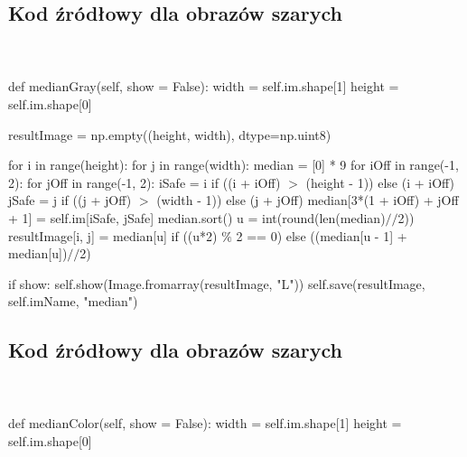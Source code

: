 \documentclass[final,a4paper,openany,12pt]{mwbk}
\begin{document}
\newpage

\subsection*{Kod źródłowy dla obrazów szarych}
\hfill
\\\\
\noindent def medianGray(self, show = False): \newline
\indent width = self.im.shape[1] \newline
\indent height = self.im.shape[0] \newline

resultImage = np.empty((height, width), dtype=np.uint8) \newline

for i in range(height): \newline
\indent for j in range(width): \newline
\indent median = [0] * 9 \newline
\indent for iOff in range(-1, 2): \newline
\indent for jOff in range(-1, 2): \newline
\indent iSafe = i if ((i + iOff) $>$ (height - 1)) else (i + iOff) \newline
\indent jSafe = j if ((j + jOff) $>$ (width - 1)) else (j + jOff) \newline
\indent median[3*(1 + iOff) + jOff + 1] = self.im[iSafe, jSafe] \newline
\indent median.sort() \newline
\indent u = int(round(len(median)$//$2)) \newline
\indent resultImage[i, j] = median[u] if ((u*2) $\%$ 2 == 0) else ((median[u - 1] + median[u])$//$2) \newline

if show: \newline
\indent self.show(Image.fromarray(resultImage, "L")) \newline
\indent self.save(resultImage, self.imName, "median") \newline
\newpage

\subsection*{Kod źródłowy dla obrazów szarych}
\hfill
\\\\
\noindent def medianColor(self, show = False): \newline
\indent width = self.im.shape[1] \newline
\indent height = self.im.shape[0] \newline
\end{document}
